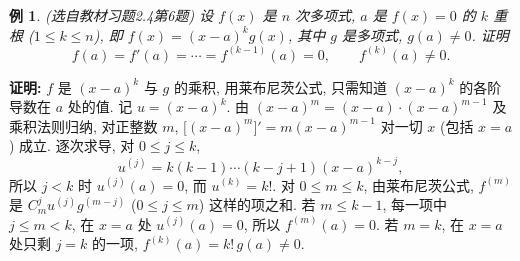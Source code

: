 \documentclass[UTF8,openany]{ctexbook}
\theoremstyle{chinesetextbook}
\newtheorem{example}{例}[section]
\newenvironment{cnproof}{\par\indent\textbf{证明:} \ignorespaces}{\par}
\begin{document}
\begin{example}\label{ex:c2-h4-6}
\textnormal{(选自教材习题2.4第6题)} 设 $f(x)$ 是 $n$ 次多项式, $a$ 是 $f(x)=0$ 的 $k$ 重根 ($1\le k\le n$), 即 $f(x)=(x-a)^kg(x)$, 其中 $g$ 是多项式, $g(a)\ne0$. 证明
\[
f(a)=f'(a)=\cdots=f^{(k-1)}(a)=0,\qquad f^{(k)}(a)\ne0.
\]
\end{example}
\begin{cnproof}
$f$ 是 $(x-a)^k$ 与 $g$ 的乘积, 用莱布尼茨公式, 只需知道 $(x-a)^k$ 的各阶导数在 $a$ 处的值. 记 $u=(x-a)^k$. 由 $(x-a)^m=(x-a)\cdot(x-a)^{m-1}$ 及乘积法则归纳, 对正整数 $m$, $\bigl[(x-a)^m\bigr]'=m(x-a)^{m-1}$ 对一切 $x$ (包括 $x=a$) 成立. 逐次求导, 对 $0\le j\le k$,
\[
u^{(j)}=k(k-1)\cdots(k-j+1)(x-a)^{k-j},
\]
所以 $j<k$ 时 $u^{(j)}(a)=0$, 而 $u^{(k)}=k!$. 对 $0\le m\le k$, 由莱布尼茨公式, $f^{(m)}$ 是 $C_m^ju^{(j)}g^{(m-j)}$ ($0\le j\le m$) 这样的项之和. 若 $m\le k-1$, 每一项中 $j\le m<k$, 在 $x=a$ 处 $u^{(j)}(a)=0$, 所以 $f^{(m)}(a)=0$. 若 $m=k$, 在 $x=a$ 处只剩 $j=k$ 的一项, $f^{(k)}(a)=k!\,g(a)\ne0$.
\end{cnproof}
\end{document}
